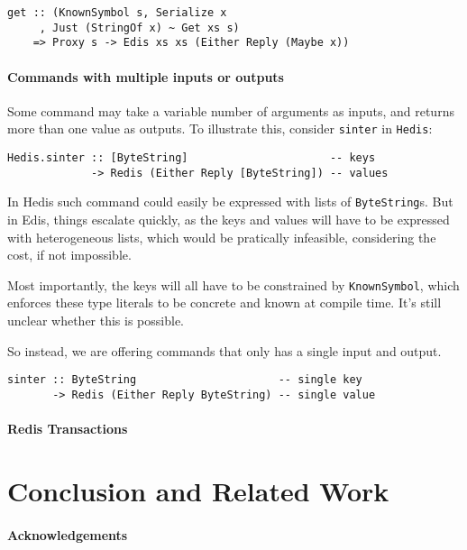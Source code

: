 \documentclass[pldi]{sigplanconf-pldi16}
\begin{document}
\begin{verbatim}
get :: (KnownSymbol s, Serialize x
     , Just (StringOf x) ~ Get xs s)
    => Proxy s -> Edis xs xs (Either Reply (Maybe x))
\end{verbatim}

\paragraph{Commands with multiple inputs or outputs}

Some command may take a variable number of arguments as inputs, and returns more
 than one value as outputs. To illustrate this, consider
 \texttt{sinter} in \texttt{Hedis}:

\begin{verbatim}
Hedis.sinter :: [ByteString]                      -- keys
             -> Redis (Either Reply [ByteString]) -- values
\end{verbatim}

In Hedis such command could easily be expressed with lists of
 \texttt{ByteString}s. But in Edis, things escalate quickly, as
 the keys and values will have to be expressed with heterogeneous
 lists\cite{hetero}, which would be pratically infeasible, considering the cost,
 if not impossible.

Most importantly, the keys will all have to be constrained by
 \texttt{KnownSymbol}, which enforces these type literals to be
 concrete and known at compile time.
 It's still unclear whether this is possible.

So instead, we are offering commands that only has a single input and output.

\begin{verbatim}
sinter :: ByteString                      -- single key
       -> Redis (Either Reply ByteString) -- single value
\end{verbatim}

\paragraph{Redis Transactions}



\section{Conclusion and Related Work}
\paragraph{Acknowledgements}




\end{document}

